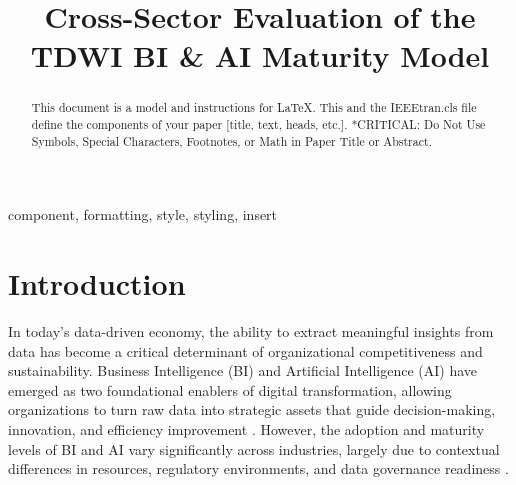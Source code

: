 \documentclass[conference]{IEEEtran}
\begin{document}
\title{Cross-Sector Evaluation of the TDWI BI \& AI Maturity Model\\
}

\author{
\and
{}
}

\maketitle

\begin{abstract}
This document is a model and instructions for \LaTeX.
This and the IEEEtran.cls file define the components of your paper [title, text, heads, etc.]. *CRITICAL: Do Not Use Symbols, Special Characters, Footnotes, 
or Math in Paper Title or Abstract.
\end{abstract}

\begin{IEEEkeywords}
component, formatting, style, styling, insert
\end{IEEEkeywords}

\section{Introduction}

In today's data-driven economy, the ability to extract meaningful insights from data has become a critical determinant of organizational competitiveness and sustainability. Business Intelligence (BI) and Artificial Intelligence (AI) have emerged as two foundational enablers of digital transformation, allowing organizations to turn raw data into strategic assets that guide decision-making, innovation, and efficiency improvement \cite{chen2012business, davenport2007competing}. However, the adoption and maturity levels of BI and AI vary significantly across industries, largely due to contextual differences in resources, regulatory environments, and data governance readiness \cite{popovic2012towards, arnott2015managing}. 
\end{document}
